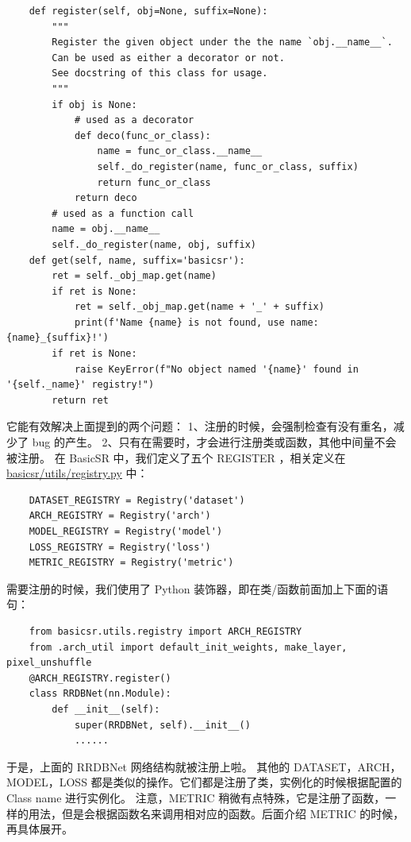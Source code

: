 \documentclass[../main.tex]{subfiles}
\begin{document}
    \begin{verbatim}
    def register(self, obj=None, suffix=None):
        """
        Register the given object under the the name `obj.__name__`.
        Can be used as either a decorator or not.
        See docstring of this class for usage.
        """
        if obj is None:
            # used as a decorator
            def deco(func_or_class):
                name = func_or_class.__name__
                self._do_register(name, func_or_class, suffix)
                return func_or_class
            return deco
        # used as a function call
        name = obj.__name__
        self._do_register(name, obj, suffix)
    def get(self, name, suffix='basicsr'):
        ret = self._obj_map.get(name)
        if ret is None:
            ret = self._obj_map.get(name + '_' + suffix)
            print(f'Name {name} is not found, use name: {name}_{suffix}!')
        if ret is None:
            raise KeyError(f"No object named '{name}' found in '{self._name}' registry!")
        return ret
    \end{verbatim}
    它能有效解决上面提到的两个问题：
    1、注册的时候，会强制检查有没有重名，减少了 bug 的产生。
    2、只有在需要时，才会进行注册类或函数，其他中间量不会被注册。
    在 BasicSR 中，我们定义了五个 REGISTER ，相关定义在 \href{https://github.com/XPixelGroup/BasicSR/blob/master/basicsr/utils/registry.py}{basicsr/utils/registry.py} 中：
    \begin{verbatim}
    DATASET_REGISTRY = Registry('dataset')
    ARCH_REGISTRY = Registry('arch')
    MODEL_REGISTRY = Registry('model')
    LOSS_REGISTRY = Registry('loss')
    METRIC_REGISTRY = Registry('metric')
    \end{verbatim}
    需要注册的时候，我们使用了 Python 装饰器，即在类/函数前面加上下面的语句：
    \begin{verbatim}
    from basicsr.utils.registry import ARCH_REGISTRY
    from .arch_util import default_init_weights, make_layer, pixel_unshuffle
    @ARCH_REGISTRY.register()
    class RRDBNet(nn.Module):
        def __init__(self):
            super(RRDBNet, self).__init__()
            ......
    \end{verbatim}
    于是，上面的 RRDBNet 网络结构就被注册上啦。
    其他的 DATASET，ARCH，MODEL，LOSS 都是类似的操作。它们都是注册了类，实例化的时候根据配置的 Class name 进行实例化。
    注意，METRIC 稍微有点特殊，它是注册了函数，一样的用法，但是会根据函数名来调用相对应的函数。后面介绍 METRIC 的时候，再具体展开。
\end{document}
